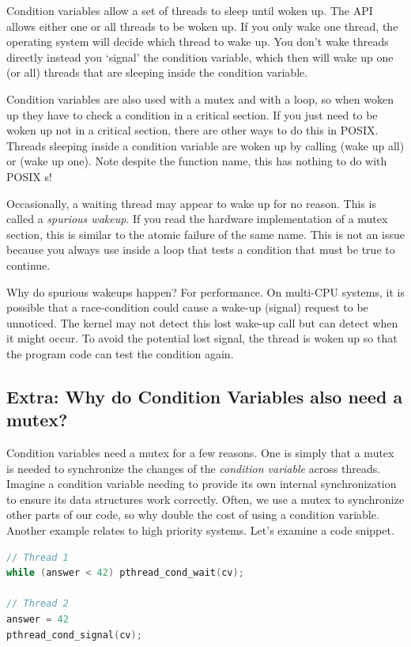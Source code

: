 Condition variables allow a set of threads to sleep until woken up.
The API allows either one or all threads to be woken up.
If you only wake one thread, the operating system will decide which thread to wake up.
You don't wake threads directly instead you `signal' the condition variable, which then will wake up one (or all) threads that are sleeping inside the condition variable.

Condition variables are also used with a mutex and with a loop, so when woken up they have to check a condition in a critical section.
If you just need to be woken up not in a critical section, there are other ways to do this in POSIX.
Threads sleeping inside a condition variable are woken up by calling  (wake up all) or  (wake up one).
Note despite the function name, this has nothing to do with POSIX s!

Occasionally, a waiting thread may appear to wake up for no reason. This is called a \emph{spurious wakeup}.
If you read the hardware implementation of a mutex section, this is similar to the atomic failure of the same name.
This is not an issue because you always use  inside a loop that tests a condition that must be true to continue.

Why do spurious wakeups happen?
For performance.
On multi-CPU systems, it is possible that a race-condition could cause a wake-up (signal) request to be unnoticed.
The kernel may not detect this lost wake-up call but can detect when it might occur.
To avoid the potential lost signal, the thread is woken up so that the program code can test the condition again.

\subsection{Extra: Why do Condition Variables also need a mutex?}

Condition variables need a mutex for a few reasons.
One is simply that a mutex is needed to synchronize the changes of the \textit{condition variable} across threads.
Imagine a condition variable needing to provide its own internal synchronization to ensure its data structures work correctly.
Often, we use a mutex to synchronize other parts of our code, so why double the cost of using a condition variable.
Another example relates to high priority systems.
Let's examine a code snippet.

\begin{lstlisting}[language=C]
// Thread 1
while (answer < 42) pthread_cond_wait(cv);

// Thread 2
answer = 42
pthread_cond_signal(cv);
\end{lstlisting}

